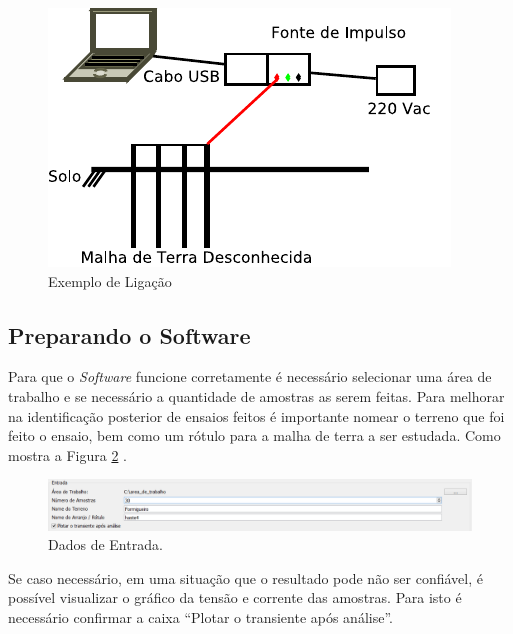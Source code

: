 \documentclass[a4paper, 10pt]{article}
\begin{document}
\begin{figure}[H]
        \caption{\label{fig_ligacao_hastes}Exemplo de Ligação}
	    \begin{center}
            \includegraphics[scale=1.2]{../fotos/conexoes/hastes.pdf}
	    \end{center}
\end{figure}

\subsection{Preparando o Software}

Para que o \textit{Software} funcione corretamente é necessário selecionar uma 
área de trabalho e se necessário a quantidade de amostras as serem feitas. 
Para melhorar na identificação posterior de ensaios feitos é importante nomear 
o terreno que foi feito o ensaio, bem como um rótulo para a malha de terra a ser 
estudada. Como mostra a Figura \ref{fig_entrando_os_dados} .

\begin{figure}[H]
        \caption{\label{fig_entrando_os_dados}Dados de Entrada.}
	    \begin{center}
            \includegraphics[scale=0.4]{../fotos/execucao/selecionando_area_trabalho_2.png}
	    \end{center}
\end{figure}

Se caso necessário, em uma situação que o resultado pode não ser confiável, 
é possível visualizar o gráfico da tensão e corrente das amostras. Para isto 
é necessário confirmar a caixa ``Plotar o transiente após análise''.
\end{document}
